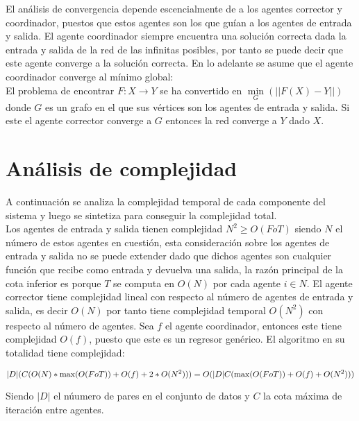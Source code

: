     El análisis de convergencia depende escencialmente de a los agentes corrector y coordinador, puestos que estos agentes son los que guían a los agentes 
    de entrada y salida. El agente coordinador siempre encuentra una solución correcta dada la entrada y salida de la red de las infinitas posibles, por tanto se 
    puede decir que este agente converge a la solución correcta. En lo adelante se asume que el agente coordinador converge al mínimo global: \\

    El problema de encontrar $F:X \rightarrow Y$ se ha convertido en $\underset{G}{\min}(||F(X)-Y||)$ donde $G$ es un grafo en el que sus vértices son los agentes de entrada y salida. Si 
    este el agente corrector converge a $G$  entonces la red converge a $Y$ dado $X$.


 \section*{Análisis de complejidad}

    A continuación se analiza la complejidad temporal de cada componente del sistema y luego se sintetiza para conseguir la complejidad total. \\

    Los agentes de entrada y salida tienen complejidad $N^2 \geq O(FoT) $ siendo $N$ el número de estos agentes en cuestión, esta consideración 
    sobre los agentes de entrada y salida no se puede extender dado que dichos agentes son cualquier función que recibe como entrada y devuelva una salida, la 
    razón principal de la cota inferior es porque $T$ se computa en $O(N)$ por cada agente $i \in N$. El agente corrector tiene complejidad lineal con respecto al número de agentes 
    de entrada y salida, es decir $O(N)$ por tanto tiene complejidad temporal $O(N^2)$ con respecto al número de agentes. Sea $f$ el agente coordinador, entonces este tiene complejidad $O(f)$, puesto que este es un regresor genérico. 
    El algoritmo en su totalidad tiene complejidad: 
    \begin{center}
        
        \begin{equation*}
                
                |D|(C( O(N) * \max(O(F o T )) + O(f) + 2 * O(N^2) )) \\
                = O(|D|C( \max(O(F o T )) + O(f) + O(N^2)))\\

        \end{equation*}

    \end{center}

Siendo $|D|$ el núumero de pares en el conjunto de datos y $C$ la cota máxima de iteración entre agentes.